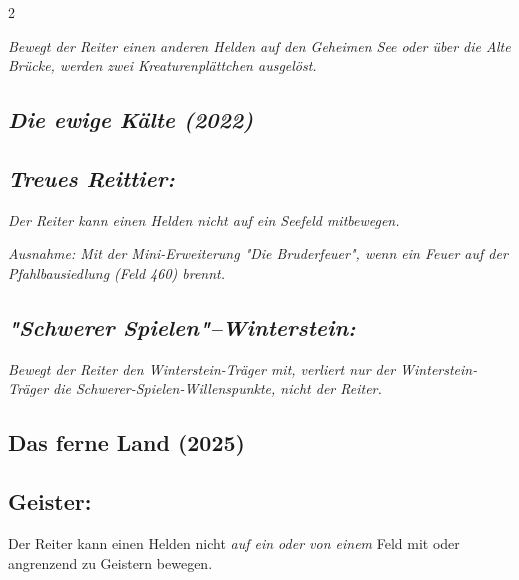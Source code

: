 \documentclass[10pt, a4paper, oneside]{book}
\newcommand{\fan}[1]{\textit{#1}}
\begin{document}
\begin{multicols*}{2}
\begin{bgcolor}[color-dz]
\fan{Bewegt der Reiter einen anderen Helden auf den Geheimen See oder über die Alte Brücke, werden zwei Kreaturenplättchen ausgelöst.}


\end{bgcolor}


\begin{bgcolor}
\section{\fan{Die ewige Kälte (2022)}}

\subsection{\fan{Treues Reittier:}}


\fan{Der Reiter kann einen Helden nicht auf ein Seefeld mitbewegen.}

\fan{Ausnahme: Mit der Mini-Erweiterung "Die Bruderfeuer", wenn ein Feuer auf der Pfahlbausiedlung (Feld 460) brennt.} 



\subsection{\fan{"Schwerer Spielen"–Winterstein:}} 

\fan{Bewegt der Reiter den Winterstein-Träger mit, verliert nur der Winterstein-Träger die Schwerer-Spielen-Willenspunkte, nicht der Reiter.}

\end{bgcolor}



\begin{bgcolor}
\section{Das ferne Land (2025)}


\subsection{Geister:}

Der Reiter kann einen Helden nicht \fan{auf ein oder von einem} Feld mit oder angrenzend zu Geistern bewegen.


\end{bgcolor}



\end{multicols*}
\end{document}
